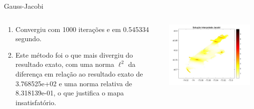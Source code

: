 \documentclass{beamer} %
\theoremstyle{definition}
\begin{document}
    \begin{frame}{Gauss-Jacobi}
        \pause
        \begin{columns}
            \begin{column}{0.5\textwidth}
               \begin{enumerate}
                   \item Convergiu com 1000 iterações e em 0.545334 segundo.
                    \pause
                    \item Este método foi o que mais divergiu do resultado exato, com uma norma $\ell^2$ da diferença em relação ao resultado exato de 3.768525e+02 e uma norma relativa de 8.318139e-01, o que justifica o mapa insatisfatório.
               \end{enumerate} 
            \end{column}
            \begin{column}{0.5\textwidth}
                \centering
                \includegraphics[width=\textwidth]{GJinterpol.jpeg}
            \end{column}
        \end{columns}
    \end{frame}
\end{document}
